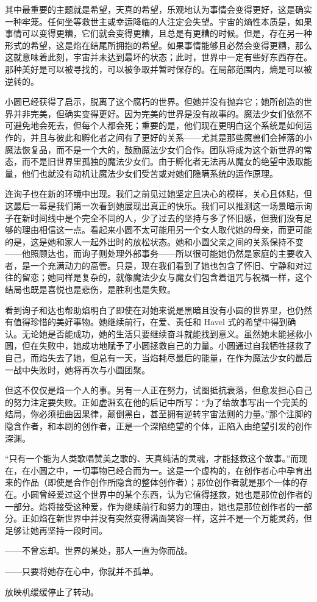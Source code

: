 其中最重要的主题就是希望，天真的希望，乐观地认为事情会变得更好，这是确实一种牢笼。任何坐等救世主或幸运降临的人注定会失望。宇宙的熵性本质是，如果事情可以变得更糟，它们就会变得更糟，且总是有更糟的时候。但是，存在另一种形式的希望，这是焰在结尾所拥抱的希望。如果事情能够且必然会变得更糟，那么这就意味着此刻，宇宙并未达到最坏的状态；此时，世界中一定有些好东西存在。那种美好是可以被寻找的，可以被争取并暂时保存的。在局部范围内，熵是可以被逆转的。

小圆已经获得了启示，脱离了这个腐朽的世界。但她并没有抛弃它；她所创造的世界并非完美，但确实变得更好。因为完美的世界是没有故事的。魔法少女们依然不可避免地会死去，但每个人都会死；重要的是，他们现在更明白这个系统是如何运作的，并且与彼此和孵化者之间有了更好的关系——尤其是那些魔兽们会掉落的小魔法恢复品，而不是一个大的，鼓励魔法少女们合作。团队将成为这个新世界的常态，而不是旧世界里孤独的魔法少女们。由于孵化者无法再从魔女的绝望中汲取能量，他们也就没有动机让魔法少女们受苦或对她们隐瞒系统的运作原理。

连询子也在新的环境中出现。我们之前见过她坚定且决心的模样，关心且体贴，但这最后一幕是我们第一次看到她展现出真正的快乐。我们可以推测这一场景暗示询子在新时间线中是个完全不同的人，少了过去的坚持与多了怀旧感，但我们没有足够的理由相信这一点。看起来小圆不太可能用另一个女人取代她的母亲，而更可能的是，这是她和家人一起外出时的放松状态。她和小圆父亲之间的关系保持不变——他照顾达也，而询子则处理外部事务——所以很可能她仍然是家庭的主要收入者，是一个充满动力的高管。只是，现在我们看到了她也包含了怀旧、宁静和对过往的留恋；她同样是复杂的，就像魔法少女与魔女们包含着诅咒与祝福一样，这个结局也既是喜悦也是悲伤，是胜利也是失败。

看到询子和达也帮助焰明白了即使在对她来说是黑暗且没有小圆的世界里，也仍然有值得珍惜的美好事物。她继续前行，在爱、责任和 Havel 式的希望中得到确认。无论她是否能成功，她的生活只要继续奋斗就能找到意义。虽然她未能拯救小圆，但在失败中，她成功地赋予了小圆拯救自己的力量。小圆通过自我牺牲拯救了自己，而焰失去了她，但总有一天，当焰耗尽最后的能量，在作为魔法少女的最后一战中失败时，她将再次与小圆团聚。

但这不仅仅是焰一个人的事。另有一人正在努力，试图抵抗衰落，但愈发担心自己的努力注定要失败。正如虚淵玄在他的后记中所写：“为了给故事写出一个完美的结局，你必须扭曲因果律，颠倒黑白，甚至拥有逆转宇宙法则的力量。”\cite{ref29}那个注脚的隐含作者，和本剧的创作者，正是一个深陷绝望的个体，正陷入由绝望引发的创作深渊。

“只有一个能为人类歌唱赞美之歌的、天真纯洁的灵魂，才能拯救这个故事。”而现在，在小圆之中，一切事物已经合而为一。这是一个虚构的，在创作者心中孕育出来的作品（即使是合作创作所隐含的整体创作者）；那位创作者就是那个一体的存在。小圆曾经爱过这个世界中的某个东西，认为它值得拯救，她也是那位创作者的一部分。焰将接受这种爱，作为继续前行和努力的理由，她也是那位创作者的一部分。正如焰在新世界中并没有突然变得满面笑容一样，这并不是一个万能灵药，但足够让她再坚持一段时间。

——不曾忘却。世界的某处，那人一直为你而战。

——只要将她存在心中，你就并不孤单。

放映机缓缓停止了转动。
